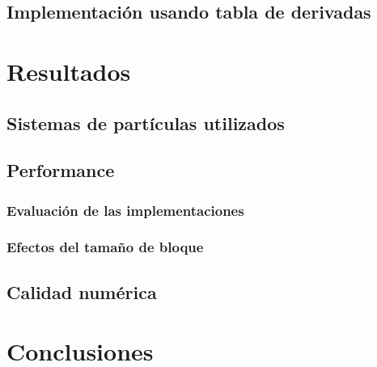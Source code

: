 \documentclass[a4paper,10pt]{report}
\begin{document}
\section{Implementación usando tabla de derivadas}


\chapter{Resultados}
\section{Sistemas de partículas utilizados}
\section{Performance}
\subsection{Evaluación de las implementaciones}
\subsection{Efectos del tamaño de bloque}
\section{Calidad numérica}

\chapter{Conclusiones}
\end{document}

